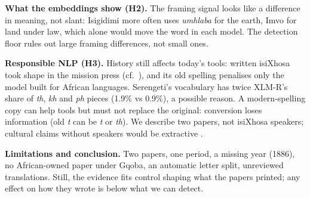 \documentclass[10pt,letterpaper]{article}
\begin{document}
\textbf{What the embeddings show (H2).} The framing signal looks like a difference in meaning, not slant: Isigidimi more often uses \emph{umhlaba} for the earth, Imvo for land under law, which alone would move the word in each model. The detection floor rules out large framing differences, not small ones.

\textbf{Responsible NLP (H3).} History still affects today's tools: written isiXhosa took shape in the mission press (cf.\ \citealp{gilmour2007}), and its old spelling penalises only the model built for African languages. Serengeti's vocabulary has twice XLM-R's share of \emph{th}, \emph{kh} and \emph{ph} pieces (1.9\% vs 0.9\%), a possible reason. A modern-spelling copy can help tools but must not replace the original: conversion loses information (old \emph{t} can be \emph{t} or \emph{th}). We describe two papers, not isiXhosa speakers; cultural claims without speakers would be extractive \citep{bird2020}.

\textbf{Limitations and conclusion.} Two papers, one period, a missing year (1886), no African-owned paper under Gqoba, an automatic letter split, unreviewed translations. Still, the evidence fits control shaping what the papers printed; any effect on how they wrote is below what we can detect.


\setlength{\bibleftmargin}{.125in}
\setlength{\bibindent}{-\bibleftmargin}


\clearpage
\onecolumn
\small
\end{document}
